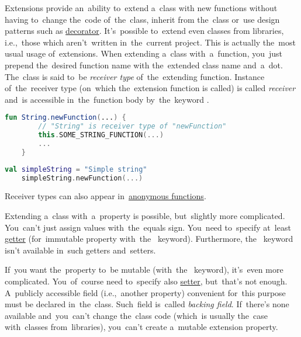 \label{kotlinextensions}
Extensions provide an~ability to~extend a~class with new functions without having to~change the~code of~the~class, inherit from the~class or~use design patterns such as \hyperref[decoratordp]{decorator}.
It's~possible to~extend even classes from libraries, i.e.,~those which aren't~written in~the~current project.
This is actually the~most usual usage of~extensions.
When extending a~class with~a~function, you~just prepend the~desired function name with the~extended class name and~a~dot.
The~class is said to~be \textit{receiver type} of~the~extending function.
Instance of~the~receiver type (on~which the~extension function is called) is called \textit{receiver} and~is accessible in~the~function body by~the~keyword .

\begin{lstlisting}[language=Kotlin, title={Extension definition}]
    fun String.newFunction(...) {
        // "String" is receiver type of "newFunction"
        this.SOME_STRING_FUNCTION(...)
        ...
    }
\end{lstlisting}
\newpage

\begin{lstlisting}[language=Kotlin, title={Usage}]
    val simpleString = "Simple string"
    simpleString.newFunction(...)
\end{lstlisting}

\note Receiver types can also appear in~\hyperref[kotlinanonymousfunction]{anonymous functions}.

\label{kotlinextensionproperty}
\noindent Extending a~class with~a~property is possible, but~slightly more complicated.
You~can't just assign values with~the~equals sign.
You~need to~specify at~least \hyperref[kotlingetset]{getter} (for~immutable property \mbox{with the } keyword).
Furthermore, \mbox{the \hyperref[kotlingetset]{}} keyword isn't available in~such getters and~setters.

If~you want the~property to~be mutable (\mbox{with the } keyword), it's~even more complicated.
You~of~course need to~specify also \hyperref[kotlingetset]{setter}, but~that's not enough.
A~publicly accessible field (i.e.,~another property) convenient for~this purpose must be declared in~the~class.
Such~field is~called \textit{backing field}.
If~there's none available and~you~can't change the~class code (which~is usually the~case with~classes from~libraries), you~can't create a~mutable extension property.

